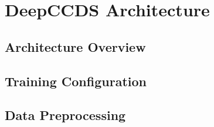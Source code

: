 \documentclass[../main.tex]{subfiles}
\begin{document}
\section{DeepCCDS Architecture}
\label{sec:method-deepccds}


\subsection{Architecture Overview}
\label{sec:deepccds-architecture}

\subsection{Training Configuration}
\label{sec:deepccds-training}

\subsection{Data Preprocessing}
\label{sec:deepccds-preprocessing}
\end{document}
